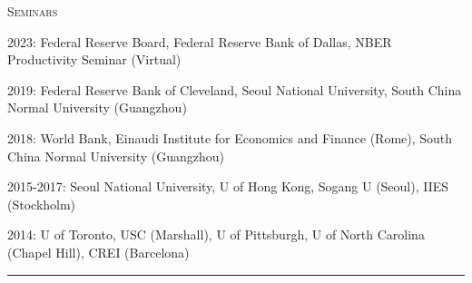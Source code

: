 \documentclass{article}
\begin{document}
\parbox{\textwidth}{
\parbox[t]{0.28\textwidth}{ \raggedright \noindent \textsc{ Seminars } }
\parbox[t]{0.72\textwidth}{ \raggedright

2023: Federal Reserve Board, Federal Reserve Bank of Dallas, NBER Productivity Seminar (Virtual)
\vspace{0.27cm}

2019: Federal Reserve Bank of Cleveland, Seoul National University, South China Normal University (Guangzhou)
\vspace{0.27cm}

2018: World Bank, Einaudi Institute for Economics and Finance (Rome), South China Normal University (Guangzhou)
\vspace{0.27cm}

2015-2017: Seoul National University, U of Hong Kong, Sogang U (Seoul), IIES (Stockholm)
\vspace{0.27cm}

2014: U of Toronto, USC (Marshall), U of Pittsburgh, U of North Carolina (Chapel Hill), CREI (Barcelona)
\vspace{0.27cm}

}
\textcolor{light-gray}{\hrule}
}
\vspace{0.3cm}
\end{document}
